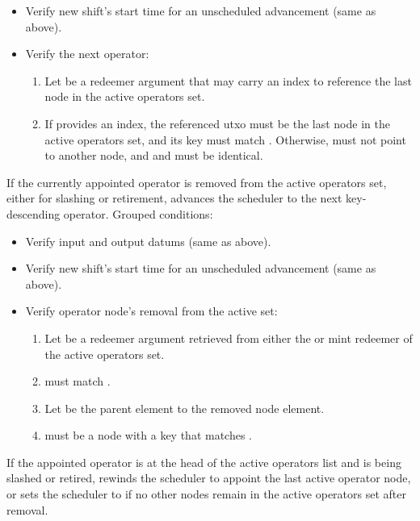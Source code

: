 \documentclass[../midgard.tex]{subfiles}
\begin{document}
\begin{description}
\begin{itemize}
          Let  be this value.
        \item Verify new shift's start time for an unscheduled advancement (same as above).
        \item Verify the next operator:
          \begin{enumerate}
            \item Let  be a redeemer argument that may carry an index to reference the last node in the active operators set.
            \item If  provides an index, the referenced utxo must be the last node in the active operators set, and its key must match .
              Otherwise,  must not point to another node, and  and  must be identical.
          \end{enumerate}
      \end{itemize}
    \item[Go to Next -- Operator Removal.] If the currently appointed operator is removed from the active operators set, either for slashing or retirement, advances the scheduler to the next key-descending operator.
      Grouped conditions:
      \begin{itemize}
        \item Verify input and output datums (same as above).
        \item Verify new shift's start time for an unscheduled advancement (same as above).
        \item Verify operator node's removal from the active set:
          \begin{enumerate}
            \item Let  be a redeemer argument retrieved from either the  or  mint redeemer of the active operators set.
            \item {} must match .
            \item Let  be the parent element to the removed node element.
            \item {} must be a node with a key that matches .
          \end{enumerate}
      \end{itemize}
    \item[Rewind -- Operator Removal.] If the appointed operator is at the head of the active operators list and is being slashed or retired, rewinds the scheduler to appoint the last active operator node, or sets the scheduler to  if no other nodes remain in the active operators set after removal.

\end{description}
\end{document}
